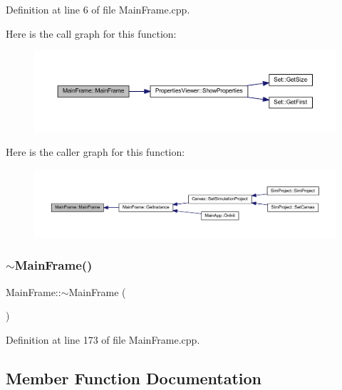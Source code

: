 Definition at line 6 of file Main\+Frame.\+cpp.

Here is the call graph for this function\+:\nopagebreak
\begin{figure}[H]
\begin{center}
\leavevmode
\includegraphics[width=350pt]{class_main_frame_a00c85521dad6b24000967206bcc53688_cgraph}
\end{center}
\end{figure}
Here is the caller graph for this function\+:
\nopagebreak
\begin{figure}[H]
\begin{center}
\leavevmode
\includegraphics[width=350pt]{class_main_frame_a00c85521dad6b24000967206bcc53688_icgraph}
\end{center}
\end{figure}
\mbox{\label{class_main_frame_a0cfd88ece4836e0ea5430bd55370bf11}} 
\subsubsection{\texorpdfstring{$\sim$\+Main\+Frame()}{~MainFrame()}}
{\footnotesize\ttfamily Main\+Frame\+::$\sim$\+Main\+Frame (\begin{DoxyParamCaption}{ }\end{DoxyParamCaption})}



Definition at line 173 of file Main\+Frame.\+cpp.



\subsection{Member Function Documentation}
\mbox{\label{class_main_frame_a3d8d476c8bb68d83d5dc006abb442851}} 
